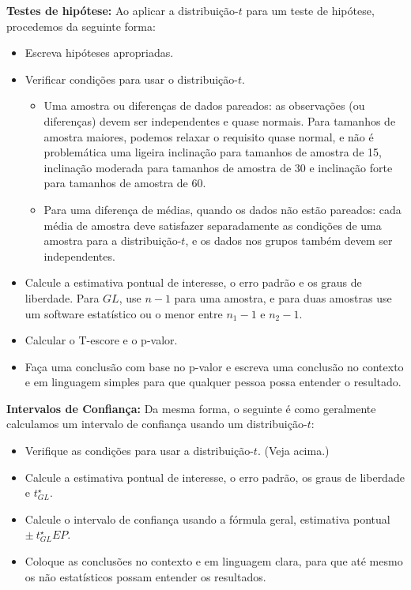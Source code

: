 \documentclass[
]{book}
\theoremstyle{definition}
\theoremstyle{definition}
\theoremstyle{definition}
\theoremstyle{definition}
\theoremstyle{remark}
\begin{document}
\textbf{Testes de hipótese:} Ao aplicar a distribuição-\(t\) para um teste de hipótese, procedemos da seguinte forma:

\begin{itemize}
\item
  Escreva hipóteses apropriadas.
\item
  Verificar condições para usar o distribuição-\(t\).

  \begin{itemize}
  \item
    Uma amostra ou diferenças de dados pareados: as observações (ou diferenças) devem ser independentes e quase normais. Para tamanhos de amostra maiores, podemos relaxar o requisito quase normal, e não é problemática uma ligeira inclinação para tamanhos de amostra de 15, inclinação moderada para tamanhos de amostra de 30 e inclinação forte para tamanhos de amostra de 60.
  \item
    Para uma diferença de médias, quando os dados não estão pareados: cada média de amostra deve satisfazer separadamente as condições de uma amostra para a distribuição-\(t\), e os dados nos grupos também devem ser independentes.
  \end{itemize}
\item
  Calcule a estimativa pontual de interesse, o erro padrão e os graus de liberdade. Para \(GL\), use \(n-1\) para uma amostra, e para duas amostras use um software estatístico ou o menor entre \(n_1 - 1\) e \(n_2 - 1\).
\item
  Calcular o T-escore e o p-valor.
\item
  Faça uma conclusão com base no p-valor e escreva uma conclusão no contexto e em linguagem simples para que qualquer pessoa possa entender o resultado.
\end{itemize}

\textbf{Intervalos de Confiança:} Da mesma forma, o seguinte é como geralmente calculamos um intervalo de confiança usando um distribuição-\(t\):

\begin{itemize}
\item
  Verifique as condições para usar a distribuição-\(t\). (Veja acima.)
\item
  Calcule a estimativa pontual de interesse, o erro padrão, os graus de liberdade e \(t^{\star}_{GL}\).
\item
  Calcule o intervalo de confiança usando a fórmula geral, estimativa pontual \(\pm\ t_{GL}^{\star} EP\).
\item
  Coloque as conclusões no contexto e em linguagem clara, para que até mesmo os não estatísticos possam entender os resultados.
\end{itemize}
\end{document}
